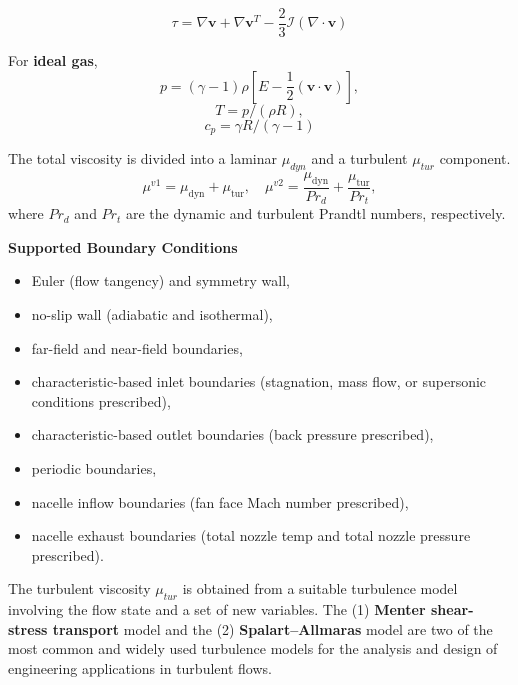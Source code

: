 \begin{frame}[allowframebreaks]
\begin{equation}
\mathcal{\tau}=\nabla \boldsymbol{v}+\nabla \boldsymbol{v}^{T}-\frac{2}{3} \mathcal{I}(\nabla \cdot \boldsymbol{v})
\end{equation}

For \textbf{ideal gas},
\begin{equation}
    p=(\gamma-1)\rho[E-\frac{1}{2}(\boldsymbol{v}\cdot \boldsymbol{v})],
\end{equation}
\begin{equation}
    T=p/(\rho R), 
\end{equation}
\begin{equation}
    c_p = \gamma R/(\gamma-1)
\end{equation}

The total viscosity is divided into a laminar $\mu_{dyn}$  and a
turbulent $\mu_{tur}$ component.
\begin{equation}
\mu^{v 1}=\mu_{\mathrm{dyn}}+\mu_{\mathrm{tur}}, \quad \mu^{v 2}=\frac{\mu_{\mathrm{dyn}}}{P r_{d}}+\frac{\mu_{\mathrm{tur}}}{P r_{t}},
\end{equation}
where $Pr_d$ and $Pr_t$ are the dynamic and turbulent Prandtl numbers,
respectively.



\framebreak
\textbf{Supported Boundary Conditions}
\begin{itemize}
    \item Euler (flow tangency) and symmetry wall,
    \item no-slip wall (adiabatic and isothermal),
    \item far-field and near-field
boundaries,
    \item characteristic-based inlet boundaries (stagnation, mass
flow, or supersonic conditions prescribed),
    \item characteristic-based
outlet boundaries (back pressure prescribed),
    \item periodic boundaries,
    \item nacelle inflow boundaries (fan face Mach number prescribed),
    \item nacelle exhaust boundaries (total nozzle temp and total nozzle
pressure prescribed).
\end{itemize}

The turbulent viscosity $\mu_{tur}$ is obtained from a suitable turbulence
model involving the flow state and a set of new variables. The (1) \textbf{Menter
shear-stress transport} model and the (2) \textbf{Spalart–Allmaras} model are two
of the most common and widely used turbulence models for the
analysis and design of engineering applications in turbulent flows.
    

\end{frame}

